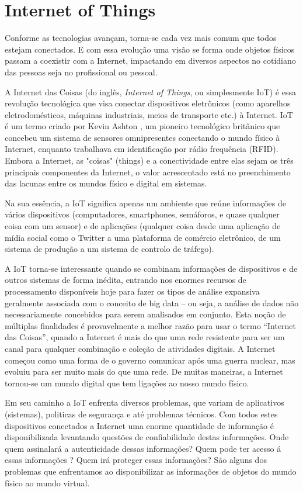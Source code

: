 \section{Internet of Things}
\label{sec:iot}

Conforme as tecnologias avançam, torna-se cada vez mais comum que todos estejam conectados. E com essa evolução uma visão se forma onde objetos físicos passam a coexistir com a Internet, impactando em diversos aspectos no cotidiano das pessoas seja no profissional ou pessoal.

A Internet das Coisas (do inglês, \textit{Internet of Things}, ou simplesmente IoT) é essa revolução tecnológica que visa conectar dispositivos eletrônicos (como aparelhos eletrodomésticos, máquinas industriais, meios de transporte etc.) à Internet. IoT é um termo criado por Kevin Ashton \cite{Kevin}, um pioneiro tecnológico britânico que concebeu um sistema de sensores omnipresentes conectando o mundo físico à Internet, enquanto trabalhava em identificação por rádio frequência (RFID). Embora a Internet, as "coisas" (things) e a conectividade entre elas sejam os três principais componentes da Internet, o valor acrescentado está no preenchimento das lacunas entre os mundos físico e digital em sistemas.

Na sua essência, a IoT significa apenas um ambiente que reúne informações de vários dispositivos (computadores, smartphones, semáforos, e quase qualquer coisa com um sensor) e de aplicações (qualquer coisa desde uma aplicação de mídia social como o Twitter a uma plataforma de comércio eletrônico, de um sistema de produção a um sistema de controlo de tráfego).

A IoT torna-se interessante quando se combinam informações de dispositivos e de outros sistemas de forma inédita, entrando nos enormes recursos de processamento disponíveis hoje para fazer os tipos de análise expansiva geralmente associada com o conceito de big data – ou seja, a análise de dados não necessariamente concebidos para serem analisados em conjunto. Esta noção de múltiplas finalidades é provavelmente a melhor razão para usar o termo “Internet das Coisas”, quando a Internet é mais do que uma rede resistente para ser um canal para qualquer combinação e coleção de atividades digitais. A Internet começou como uma forma de o governo comunicar após uma guerra nuclear, mas evoluiu para ser muito mais do que uma rede. De muitas maneiras, a Internet tornou-se um mundo digital que tem ligações ao nosso mundo físico.

Em seu caminho a IoT enfrenta diversos problemas, que variam de aplicativos (sistemas), politicas de segurança e até problemas técnicos. Com todos estes dispositivos conectados a Internet uma enorme quantidade de informação é disponibilizada levantando questões de confiabilidade destas informações. Onde quem assinalará a autenticidade dessas informações? Quem pode ter acesso á essas informações ? Quem irá proteger essas informações? São alguns dos problemas que enfrentamos ao disponibilizar as informações de objetos do mundo físico ao mundo virtual.

